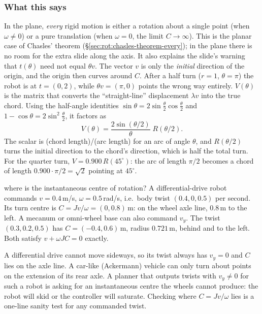 \subsubsection{What this says}
In the plane, \emph{every} rigid motion is either a rotation about a single point (when $\omega\neq0$) or a pure translation (when $\omega=0$, the limit $C\to\infty$). This is the planar case of Chasles' theorem (\S\ref{sec:rot:chasles-theorem-every}); in the plane there is no room for the extra slide along the axis. It also explains the slide's warning that $t(\theta)$ need not equal $\theta v$. The vector $v$ is only the \emph{initial} direction of the origin, and the origin then curves around $C$. After a half turn ($r=1$, $\theta=\pi$) the robot is at $t=(0,2)$, while $\theta v=(\pi,0)$ points the wrong way entirely. $V(\theta)$ is the matrix that converts the ``straight-line'' displacement $\lambda v$ into the true chord. Using the half-angle identities $\sin\theta=2\sin\frac\theta2\cos\frac\theta2$ and $1-\cos\theta=2\sin^2\frac\theta2$, it factors as
\begin{equation}
V(\theta)=\frac{2\sin(\theta/2)}{\theta}\;R(\theta/2).\label{eq:pl:V-factor}
\end{equation}
The scalar is (chord length)/(arc length) for an arc of angle $\theta$, and $R(\theta/2)$ turns the initial direction to the chord's direction, which is half the total turn. For the quarter turn, $V=0.900\,R(45^\circ)$: the arc of length $\pi/2$ becomes a chord of length $0.900\cdot\pi/2=\sqrt2$ pointing at $45^\circ$.

\begin{example}{where is the instantaneous centre of rotation?}
A differential-drive robot commands $v=0.4$\,m/s, $\omega=0.5$\,rad/s, i.e.\ body twist $(0.4,0,0.5)$ per second. Its turn centre is $C=Jv/\omega=(0,0.8)$\,m: on the wheel axle line, $0.8$\,m to the left. A mecanum or omni-wheel base can also command $v_y$. The twist $(0.3,0.2,0.5)$ has $C=(-0.4,0.6)$\,m, radius $0.721$\,m, behind and to the left. Both satisfy $v+\omega JC=0$ exactly.
\end{example}

\begin{pitfall}
A differential drive cannot move sideways, so its twist always has $v_y=0$ and $C$ lies on the axle line. A car-like (Ackermann) vehicle can only turn about points on the extension of its rear axle. A planner that outputs twists with $v_y\neq0$ for such a robot is asking for an instantaneous centre the wheels cannot produce: the robot will skid or the controller will saturate. Checking where $C=Jv/\omega$ lies is a one-line sanity test for any commanded twist.
\end{pitfall}
